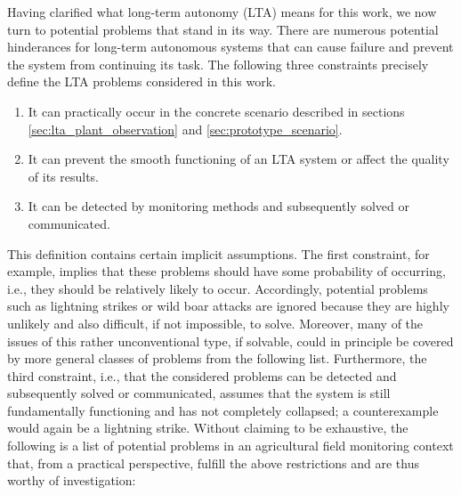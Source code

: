\documentclass[english, master, utf8]{base/thesis_KBS}
\begin{document}
Having clarified what long-term autonomy (LTA) means for this work, we now turn to potential problems that stand in its way.
There are numerous potential hinderances for long-term autonomous systems that can cause failure and prevent the system from continuing its task.
The following three constraints precisely define the LTA problems considered in this work.
\begin{enumerate}
    \item It can practically occur in the concrete scenario described in sections \ref{sec:lta_plant_observation} and \ref{sec:prototype_scenario}.
    \item It can prevent the smooth functioning of an LTA system or affect the quality of its results.
    \item It can be detected by monitoring methods and subsequently solved or communicated.
\end{enumerate}
This definition contains certain implicit assumptions. The first constraint, for example, implies that these problems should have some probability of occurring,
i.e., they should be relatively likely to occur. Accordingly, potential problems such as lightning strikes or wild boar attacks are ignored because they are highly 
unlikely and also difficult, if not impossible, to solve. Moreover, many of the issues of this rather unconventional type, if solvable, could in principle be covered
by more general classes of problems from the following list. Furthermore, the third constraint, i.e., that the considered problems can be detected and subsequently solved 
or communicated, assumes that the system is still fundamentally functioning and has not completely collapsed; a counterexample would again be a lightning strike.
Without claiming to be exhaustive, the following is a list of potential problems in an agricultural field monitoring context that, 
from a practical perspective, fulfill the above restrictions and are thus worthy of investigation:
\end{document}
